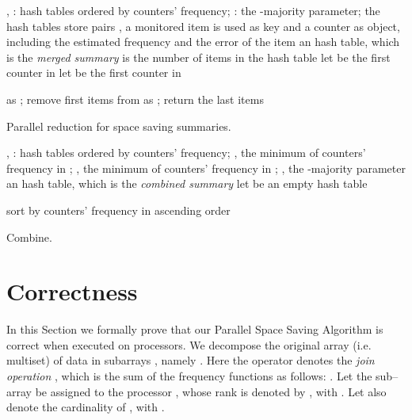 \documentclass[final,3p,times]{elsarticle}
\begin{document}
\begin{algorithm}
\begin{algorithmic}[1]
\Require , : hash tables ordered by counters' frequency; : the -majority parameter; 
	the hash tables store pairs , a monitored item  is used as key and a counter  as object, including the estimated frequency  and the error  of the item 
\Ensure an hash table, which is the \textit{merged summary} 
        \Comment  is the number of items in the hash table 
	\If{}
		\State let  be the first counter in 
		\State 
	\Else
		\State 
	\EndIf
	\If{}
		\State let  be the first counter in 
		\State 
	\Else
		\State 
	\EndIf
\State 

\If{}
	\State \Return  as ;
\Else 
	\State 
	\State remove first  items from 
	\State \Return  as ; \Comment return the last  items
\EndIf

\EndProcedure
\caption{Parallel reduction for space saving summaries.}
\label{pssr}
\end{algorithmic}
\end{algorithm}



\begin{algorithm}
\begin{algorithmic}[1]
\Require , : hash tables ordered by counters' frequency; , the minimum of counters' frequency in ; , the minimum of counters' frequency in ; , the -majority parameter
\Ensure an hash table, which is the \textit{combined summary} 
\State let  be an empty hash table
	\State 
	\State 	
	\State 
	\If{}
		\State 
		\State 
		\State 
		\State 
	\Else
		\State 
		\State 
		\State 
	\EndIf
\EndFor

	\State 
	\State 	
	\State 
	\State 
	\State 
\EndFor

\State sort  by counters' frequency in ascending order
\State \Return 
\EndProcedure
\caption{Combine.}
\label{combine}
\end{algorithmic}
\end{algorithm}



\section{Correctness}
\label{correctness}

In this Section we formally prove that our Parallel Space Saving Algorithm is correct when executed on  processors. We decompose the original array (i.e. multiset) of data  in  subarrays  , namely . Here
the  operator denotes the \textit{join operation} \cite{Syropoulos01}, which is the sum of the frequency functions as follows:
.
Let the sub--array  be assigned to the processor , whose rank is denoted by , with . Let also  denote the cardinality of , with .
\end{document}
